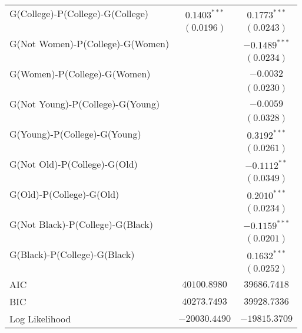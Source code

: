 \begin{center}
\begin{longtable}{l c c}
G(College)-P(College)-G(College)    & $0.1403^{***}$  & $0.1773^{***}$  \\
                                    & $(0.0196)$      & $(0.0243)$      \\
G(Not Women)-P(College)-G(Women)    &                 & $-0.1489^{***}$ \\
                                    &                 & $(0.0234)$      \\
G(Women)-P(College)-G(Women)        &                 & $-0.0032$       \\
                                    &                 & $(0.0230)$      \\
G(Not Young)-P(College)-G(Young)    &                 & $-0.0059$       \\
                                    &                 & $(0.0328)$      \\
G(Young)-P(College)-G(Young)        &                 & $0.3192^{***}$  \\
                                    &                 & $(0.0261)$      \\
G(Not Old)-P(College)-G(Old)        &                 & $-0.1112^{**}$  \\
                                    &                 & $(0.0349)$      \\
G(Old)-P(College)-G(Old)            &                 & $0.2010^{***}$  \\
                                    &                 & $(0.0234)$      \\
G(Not Black)-P(College)-G(Black)    &                 & $-0.1159^{***}$ \\
                                    &                 & $(0.0201)$      \\
G(Black)-P(College)-G(Black)        &                 & $0.1632^{***}$  \\
                                    &                 & $(0.0252)$      \\
\midrule
AIC                                 & $40100.8980$    & $39686.7418$    \\
BIC                                 & $40273.7493$    & $39928.7336$    \\
Log Likelihood                      & $-20030.4490$   & $-19815.3709$   \\
\end{longtable}
\end{center}
